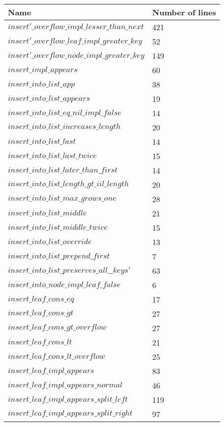 \begin{tabular}{| l | l |}
\hline
Name & Number of lines \\ \hline
$insert'\_overflow\_impl\_lesser\_than\_next$ & 421 \\ \hline
$insert'\_overflow\_leaf\_impl\_greater\_key$ & 52 \\ \hline
$insert'\_overflow\_node\_impl\_greater\_key$ & 149 \\ \hline
$insert\_impl\_appears$ & 60 \\ \hline
$insert\_into\_list\_app$ & 38 \\ \hline
$insert\_into\_list\_appears$ & 19 \\ \hline
$insert\_into\_list\_eq\_nil\_impl\_false$ & 14 \\ \hline
$insert\_into\_list\_increases\_length$ & 20 \\ \hline
$insert\_into\_list\_last$ & 14 \\ \hline
$insert\_into\_list\_last\_twice$ & 15 \\ \hline
$insert\_into\_list\_later\_than\_first$ & 14 \\ \hline
$insert\_into\_list\_length\_gt\_iil\_length$ & 20 \\ \hline
$insert\_into\_list\_max\_grows\_one$ & 28 \\ \hline
$insert\_into\_list\_middle$ & 21 \\ \hline
$insert\_into\_list\_middle\_twice$ & 15 \\ \hline
$insert\_into\_list\_override$ & 13 \\ \hline
$insert\_into\_list\_prepend\_first$ & 7 \\ \hline
$insert\_into\_list\_preserves\_all\_\_keys'$ & 63 \\ \hline
$insert\_into\_node\_impl\_leaf\_false$ & 6 \\ \hline
$insert\_leaf\_cons\_eq$ & 17 \\ \hline
$insert\_leaf\_cons\_gt$ & 27 \\ \hline
$insert\_leaf\_cons\_gt\_overflow$ & 27 \\ \hline
$insert\_leaf\_cons\_lt$ & 21 \\ \hline
$insert\_leaf\_cons\_lt\_overflow$ & 25 \\ \hline
$insert\_leaf\_impl\_appears$ & 83 \\ \hline
$insert\_leaf\_impl\_appears\_normal$ & 46 \\ \hline
$insert\_leaf\_impl\_appears\_split\_left$ & 119 \\ \hline
$insert\_leaf\_impl\_appears\_split\_right$ & 97 \\ \hline

\end{tabular}
